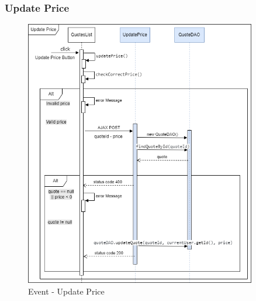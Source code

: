 \documentclass[a4paper, 12pt]{article}
\begin{document}
\subsubsection{Update Price}
\begin{figure}[h!]
	\centering
	\includegraphics[width=0.9\textwidth]{RIA_images/UpdatePrice.png}
	\caption{Event - Update Price}
	\label{figure:UpdatePriceRIA}
\end{figure}
\end{document}
